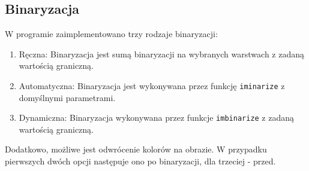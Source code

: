 \subsection{Binaryzacja}
	W programie zaimplementowano trzy rodzaje binaryzacji:
	\begin{enumerate}
		\item Ręczna: Binaryzacja jest sumą binaryzacji na wybranych warstwach z zadaną wartością graniczną.
		\item Automatyczna: Binaryzacja jest wykonywana przez funkcję \lstinline|iminarize| z domyślnymi parametrami.
		\item Dynamiczna: Binaryzacja wykonywana przez funkcje \lstinline|imbinarize| z zadaną wartością graniczną.
	\end{enumerate}
	Dodatkowo, możliwe jest odwrócenie kolorów na obrazie. W przypadku pierwszych dwóch opcji następuje ono po binaryzacji,
	dla trzeciej - przed.